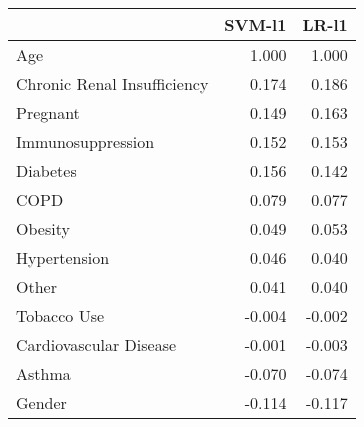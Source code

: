 \begin{tabular}{lrr}
\toprule
{} &  SVM-l1 &  LR-l1 \\
\midrule
Age                         &   1.000 &  1.000 \\
Chronic Renal Insufficiency &   0.174 &  0.186 \\
Pregnant                    &   0.149 &  0.163 \\
Immunosuppression           &   0.152 &  0.153 \\
Diabetes                    &   0.156 &  0.142 \\
COPD                        &   0.079 &  0.077 \\
Obesity                     &   0.049 &  0.053 \\
Hypertension                &   0.046 &  0.040 \\
Other                       &   0.041 &  0.040 \\
Tobacco Use                 &  -0.004 & -0.002 \\
Cardiovascular Disease      &  -0.001 & -0.003 \\
Asthma                      &  -0.070 & -0.074 \\
Gender                      &  -0.114 & -0.117 \\
\bottomrule
\end{tabular}
